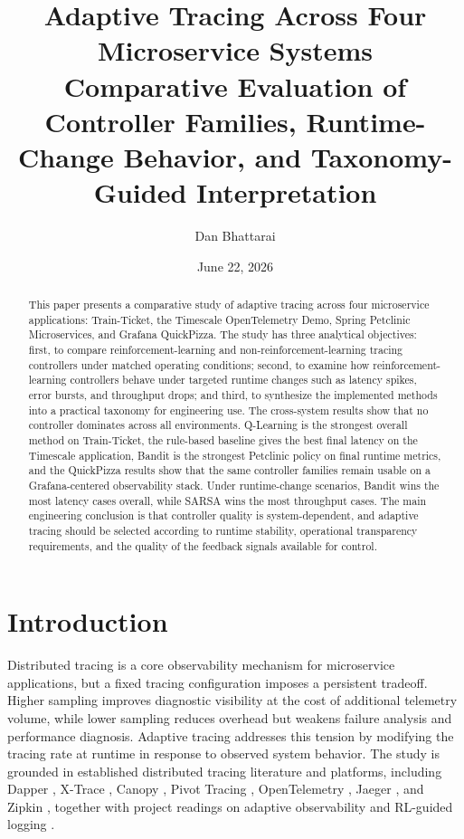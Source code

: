 \documentclass[10pt,twocolumn]{article}
\title{\textbf{Adaptive Tracing Across Four Microservice Systems}\\[0.2em]
\large Comparative Evaluation of Controller Families, Runtime-Change Behavior, and Taxonomy-Guided Interpretation}
\author{Dan Bhattarai}
\date{June 22, 2026}
\begin{document}
\maketitle
\thispagestyle{fancy}

\begin{abstract}
This paper presents a comparative study of adaptive tracing across four microservice applications: Train-Ticket, the Timescale OpenTelemetry Demo, Spring Petclinic Microservices, and Grafana QuickPizza. The study has three analytical objectives: first, to compare reinforcement-learning and non-reinforcement-learning tracing controllers under matched operating conditions; second, to examine how reinforcement-learning controllers behave under targeted runtime changes such as latency spikes, error bursts, and throughput drops; and third, to synthesize the implemented methods into a practical taxonomy for engineering use. The cross-system results show that no controller dominates across all environments. Q-Learning is the strongest overall method on Train-Ticket, the rule-based baseline gives the best final latency on the Timescale application, Bandit is the strongest Petclinic policy on final runtime metrics, and the QuickPizza results show that the same controller families remain usable on a Grafana-centered observability stack. Under runtime-change scenarios, Bandit wins the most latency cases overall, while SARSA wins the most throughput cases. The main engineering conclusion is that controller quality is system-dependent, and adaptive tracing should be selected according to runtime stability, operational transparency requirements, and the quality of the feedback signals available for control.
\end{abstract}

\section{Introduction}
Distributed tracing is a core observability mechanism for microservice applications, but a fixed tracing configuration imposes a persistent tradeoff. Higher sampling improves diagnostic visibility at the cost of additional telemetry volume, while lower sampling reduces overhead but weakens failure analysis and performance diagnosis. Adaptive tracing addresses this tension by modifying the tracing rate at runtime in response to observed system behavior. The study is grounded in established distributed tracing literature and platforms, including Dapper \cite{dapper}, X-Trace \cite{xtrace}, Canopy \cite{canopy}, Pivot Tracing \cite{pivot}, OpenTelemetry \cite{otel}, Jaeger \cite{jaeger}, and Zipkin \cite{zipkin}, together with project readings on adaptive observability and RL-guided logging \cite{als}.
\end{document}
